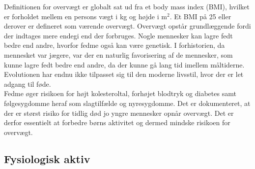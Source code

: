 Definitionen for overvægt er globalt sat ud fra et body mass index (BMI), hvilket er forholdet mellem en persons vægt i kg og højde i m$^2$. Et BMI på 25 eller derover er defineret som værende overvægt. Overvægt opstår grundlæggende fordi der indtages mere endegi end der forbruges. \citep{Academic2016} Nogle mennesker kan lagre fedt bedre end andre, hvorfor fedme også kan være genetisk. I forhistorien, da mennesket var jægere, var der en naturlig favorisering af de mennesker, som kunne lagre fedt bedre end andre, da der kunne gå lang tid imellem måltiderne. Evolutionen har endnu ikke tilpasset sig til den moderne livsstil, hvor der er let adgang til føde. \citep{Ahmad2014} \\
Fedme øger risikoen for højt kolesteroltal, forhøjet blodtryk og diabetes samt følgesygdomme heraf som slagtilfælde og nyresygdomme. Det er dokumenteret, at der er størst risiko for tidlig død jo yngre mennesker opnår overvægt. Det er derfor essentielt at forbedre børns aktivitet og dermed mindske risikoen for overvægt. \citep{Nestle2014} 

\citep{Ahmad2014}


\subsection{Fysiologisk aktiv}


